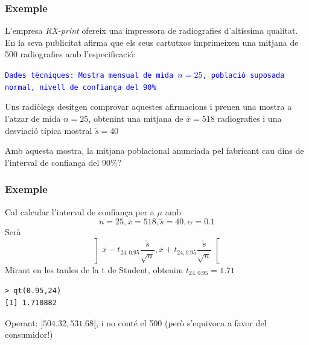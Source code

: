 \documentclass[12pt,t]{beamer}
\newcommand{\blue}[1]{\textcolor{blue}{#1}}
\theoremstyle{plain}
\theoremstyle{definition}
\begin{document}
%
%
%
%
%
%
%
%
%




\begin{frame}
\frametitle{Exemple}

L'empresa \textsl{RX-print} ofereix una impressora de radiografies d'altíssima qualitat. En la seva publicitat afirma que els seus
cartutxos imprimeixen una mitjana de 500 radiografies amb l'especificació: 
\medskip

\blue{\texttt{Dades tècniques: Mostra mensual de mida $n=25$,
població suposada normal, nivell de confiança del 90\%}}
\medskip 

Uns radiòlegs desitgen comprovar aquestes afirmacions i prenen una
mostra a l'atzar de mida $n=25$, obtenint
una mitjana de $\overline{x}=518$ radiografies i una desviació típica mostral
$\widetilde{s}=40$
\medskip

Amb aquesta mostra, la mitjana poblacional anunciada pel fabricant cau dins de l'interval de confiança del 90\%?
\end{frame}

\begin{frame}[fragile]
\frametitle{Exemple}
Cal calcular l'interval de confiança per a $\mu$ amb 
$$
n=25, \overline{x}=518, \widetilde{s}=40, \alpha=0.1
$$
Serà
$$
\left] 
\overline{x}-t_{24,0.95} \frac{\widetilde{s}}{\sqrt{n}},
\overline{x}+t_{24,0.95} \frac{\widetilde{s}}{\sqrt{n}}\right[
$$
Mirant en les taules de la t de Student, obtenim $t_{24,0.95}=1.71$
\begin{verbatim}
> qt(0.95,24)
[1] 1.710882
\end{verbatim}

Operant: $]504.32,531.68[$, i no conté el 500 (però s'equivoca a favor del consumidor!)
\end{frame}
\end{document}

